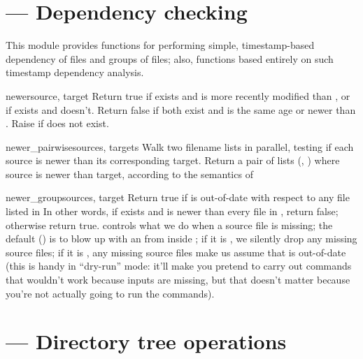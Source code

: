 \documentclass{manual}
\begin{document}
\section{ --- Dependency checking}

This module provides functions for performing simple, timestamp-based 
dependency of files and groups of files; also, functions based entirely 
on such timestamp dependency analysis.

\begin{funcdesc}{newer}{source, target}
Return true if  exists and is more recently modified than
, or if  exists and  doesn't.
Return false if both exist and  is the same age or newer 
than .
Raise  if  does not exist.
\end{funcdesc}

\begin{funcdesc}{newer_pairwise}{sources, targets}
Walk two filename lists in parallel, testing if each source is newer
than its corresponding target.  Return a pair of lists (,
) where source is newer than target, according to the semantics
of 
\end{funcdesc}

\begin{funcdesc}{newer_group}{sources, target}
Return true if  is out-of-date with respect to any file
listed in   In other words, if  exists and is newer
than every file in , return false; otherwise return true.
 controls what we do when a source file is missing; the
default () is to blow up with an  from 
inside ;
if it is , we silently drop any missing source files; if it is
, any missing source files make us assume that  is
out-of-date (this is handy in ``dry-run'' mode: it'll make you pretend to
carry out commands that wouldn't work because inputs are missing, but
that doesn't matter because you're not actually going to run the
commands).
\end{funcdesc}

\section{ --- Directory tree operations}
\end{document}
